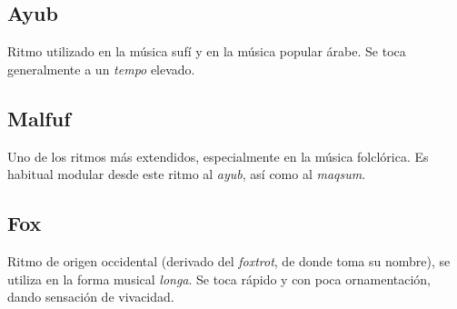 
\subsection{Ayub}

Ritmo utilizado en la música sufí y en la música popular árabe. Se toca generalmente a un \emph{tempo} elevado.

\begin{center}
\end{center}


\subsection{Malfuf}

Uno de los ritmos más extendidos, especialmente en la música folclórica. Es habitual modular desde este ritmo al \emph{ayub}, así como al \emph{maqsum}.

\begin{center}
\end{center}


\subsection{Fox}

Ritmo de origen occidental (derivado del \emph{foxtrot}, de donde toma su nombre), se utiliza en la forma musical \emph{longa}. Se toca rápido y con poca ornamentación, dando sensación de vivacidad.

\begin{center}
\end{center}

